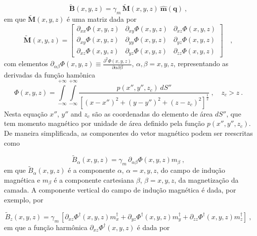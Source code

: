 \begin{equation}
\tilde{\mathbf{B}}(x, y, z) = \gamma_{m} \, \tilde{\mathbf{M}}(x, y, z) \: \hat{\mathbf{m}}(\mathbf{q}) \: ,
\label{eq:B-eqlayer}
\end{equation}
em que $\tilde{\mathbf{M}}(x, y, z)$ é uma matriz dada por 
\begin{equation}
\tilde{\mathbf{M}}(x, y, z) = \begin{bmatrix}
\partial_{xx} \Phi(x, y, z) & 
\partial_{xy} \Phi(x, y, z) &
\partial_{xz} \Phi(x, y, z) \\
\partial_{xy} \Phi(x, y, z) & 
\partial_{yy} \Phi(x, y, z) &
\partial_{yz} \Phi(x, y, z) \\
\partial_{xz} \Phi(x, y, z) & 
\partial_{yz} \Phi(x, y, z) &
\partial_{zz} \Phi(x, y, z)
\end{bmatrix} \quad ,
\label{eq:M-matriz-eqlayer-B}
\end{equation}
com elementos 
$\partial_{\alpha\beta} \Phi(x, y, z) \equiv 
\frac{\partial^{2} \Phi(x, y, z)}{\partial \alpha \partial \beta}$, 
$\alpha, \beta = x, y, z$, representando as derivadas da função hamônica 
\begin{equation}
\Phi(x, y, z) = \int\limits_{-\infty}^{+\infty}\int\limits_{-\infty}^{+\infty}
\frac{p(x'', y'', z_{c}) \: dS''}
{\left[ (x-x'')^2 + (y-y'')^2 + (z-z_{c})^2 \right]^{\frac{1}{2}}} \: ,
\quad z_{c} > z \: .
\label{eq:Phi-integral-superficie-B}
\end{equation}
Nesta equação $x''$, $y''$ and $z_{c}$ são as coordenadas do elemento de área $dS''$, que tem momento magnético por unidade de área definido pela função $p(x'', y'', z_{c})$. De maneira simplificada, as componentes do vetor magnético podem ser reescritas como

\begin{equation}
\tilde{B}_{\alpha}(x, y, z) = \gamma_{m} \, \partial_{\alpha\beta} \Phi(x, y, z) m_{\beta} \: ,
\label{eq:B-eqlayer-notacao-einstein}
\end{equation}
em que $\tilde{B}_{\alpha} (x,y,z)$ é a componente $\alpha$, $\alpha=x,y,z$, do campo de indução magnética e $m_{\beta}$ é a componente cartesiana $\beta$, $\beta =x,y,z$, da magnetização da camada. A componente vertical do campo de indução magnética é dada, por exemplo, por 

\begin{equation}
\tilde{B}_{z}(x, y, z) = \gamma_{m} \,[ \partial_{xz} \Phi^{\dagger}(x, y, z) m_{x}^{\dagger} + \partial_{yz} \Phi^{\dagger}(x, y, z) m_{y}^{\dagger} + \partial_{zz} \Phi^{\dagger}(x, y, z) m_{z}^{\dagger} ]  \: ,
\label{eq:Bz-eqlayer}
\end{equation}
em que a função harmônica $\partial_{xz} \Phi^{\dagger}(x, y, z)$ é dada por 

